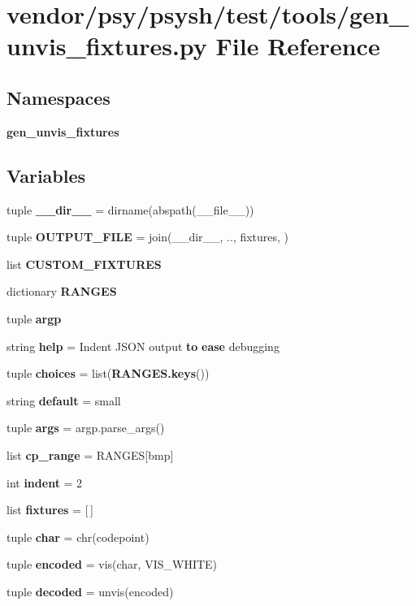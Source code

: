 \section{vendor/psy/psysh/test/tools/gen\+\_\+unvis\+\_\+fixtures.py File Reference}
\label{gen__unvis__fixtures_8py}
\subsection*{Namespaces}
\begin{DoxyCompactItemize}
\item 
 {\bf gen\+\_\+unvis\+\_\+fixtures}
\end{DoxyCompactItemize}
\subsection*{Variables}
\begin{DoxyCompactItemize}
\item 
tuple {\bf \+\_\+\+\_\+dir\+\_\+\+\_\+} = dirname(abspath(\+\_\+\+\_\+file\+\_\+\+\_\+))
\item 
tuple {\bf O\+U\+T\+P\+U\+T\+\_\+\+F\+I\+L\+E} = join(\+\_\+\+\_\+dir\+\_\+\+\_\+, \textquotesingle{}..\textquotesingle{}, \textquotesingle{}fixtures\textquotesingle{}, \textquotesingle{})
\item 
list {\bf C\+U\+S\+T\+O\+M\+\_\+\+F\+I\+X\+T\+U\+R\+E\+S}
\item 
dictionary {\bf R\+A\+N\+G\+E\+S}
\item 
tuple {\bf argp}
\item 
string {\bf help} = \textquotesingle{}Indent J\+S\+O\+N output {\bf to} {\bf ease} debugging\textquotesingle{}
\item 
tuple {\bf choices} = list({\bf R\+A\+N\+G\+E\+S.\+keys}())
\item 
string {\bf default} = \textquotesingle{}small\textquotesingle{}
\item 
tuple {\bf args} = argp.\+parse\+\_\+args()
\item 
list {\bf cp\+\_\+range} = R\+A\+N\+G\+E\+S[\textquotesingle{}bmp\textquotesingle{}]
\item 
int {\bf indent} = 2
\item 
list {\bf fixtures} = [$\,$]
\item 
tuple {\bf char} = chr(codepoint)
\item 
tuple {\bf encoded} = vis(char, V\+I\+S\+\_\+\+W\+H\+I\+T\+E)
\item 
tuple {\bf decoded} = unvis(encoded)
\end{DoxyCompactItemize}
